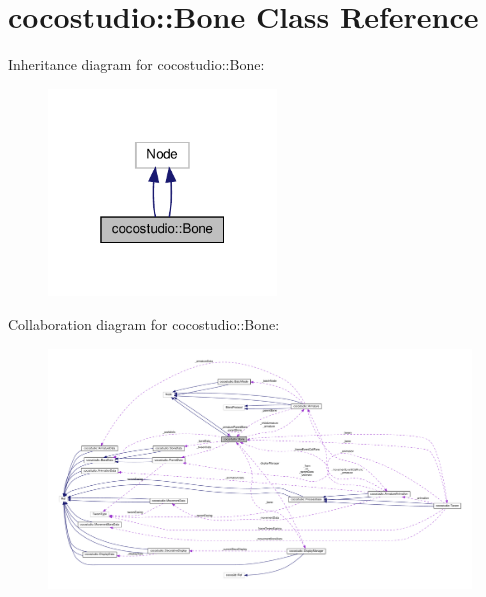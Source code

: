 \hypertarget{classcocostudio_1_1Bone}{}\section{cocostudio\+:\+:Bone Class Reference}
\label{classcocostudio_1_1Bone}


Inheritance diagram for cocostudio\+:\+:Bone\+:
\nopagebreak
\begin{figure}[H]
\begin{center}
\leavevmode
\includegraphics[width=172pt]{classcocostudio_1_1Bone__inherit__graph}
\end{center}
\end{figure}


Collaboration diagram for cocostudio\+:\+:Bone\+:
\nopagebreak
\begin{figure}[H]
\begin{center}
\leavevmode
\includegraphics[width=350pt]{classcocostudio_1_1Bone__coll__graph}
\end{center}
\end{figure}
